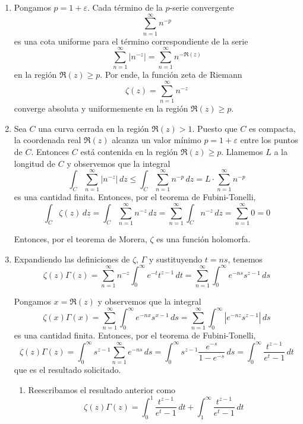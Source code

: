 \begin{solution}
\leavevmode
\begin{enumerate}[label=\alph*)]
    \item Pongamos $p = 1 + \varepsilon$. Cada término de la $p$-serie convergente
    $$\sum_{n=1}^\infty n^{-p}$$
    es una cota uniforme para el término correspondiente de la serie
    $$\sum_{n=1}^\infty \left| n^{-z} \right| = \sum_{n=1}^\infty n^{-\Re(z)}$$
    en la región $\Re(z) \ge p$. Por ende, la función zeta de Riemann
    $$\zeta(z) = \sum_{n=1}^\infty n^{-z}$$
    converge absoluta y uniformemente en la región $\Re(z) \ge p$.
    
    \item Sea $C$ una curva cerrada en la región $\Re(z) > 1$. Puesto que $C$ es compacta, la coordenada real $\Re(z)$ alcanza un valor mínimo $p = 1 + \varepsilon$ entre los puntos de $C$. Entonces $C$ está contenida en la región $\Re(z) \ge p$. Llamemos $L$ a la longitud de $C$ y observemos que la integral
    $$
    \int_C \sum_{n=1}^\infty \left| n^{-z} \right| \, dz
        \le \int_C \sum_{n=1}^\infty n^{-p} \, dz
        = L \cdot \sum_{n=1}^\infty n^{-p}
    $$
    es una cantidad finita. Entonces, por el teorema de Fubini-Tonelli,
    $$
    \int_C \zeta(z) \, dz
        = \int_C \sum_{n=1}^\infty n^{-z} \, dz
        = \sum_{n=1}^\infty \int_C n^{-z} \, dz
        = \sum_{n=1}^\infty 0
        = 0
    $$
    
    Entonces, por el teorema de Morera, $\zeta$ es una función holomorfa.
    
    \item Expandiendo las definiciones de $\zeta$, $\Gamma$ y sustituyendo $t = ns$, tenemos
    $$
    \zeta(z) \Gamma(z)
        = \sum_{n=1}^\infty n^{-z} \int_0^\infty e^{-t} t^{z-1} \, dt
        = \sum_{n=1}^\infty \int_0^\infty e^{-ns} s^{z-1} \, ds
    $$
    
    Pongamos $x = \Re(z)$ y observemos que la integral
    $$
    \zeta(x) \Gamma(x)
        = \sum_{n=1}^\infty \int_0^\infty e^{-nx} s^{x-1} \, ds
        = \sum_{n=1}^\infty \int_0^\infty \left| e^{-nz} s^{z-1} \right| \, ds
    $$
    es una cantidad finita. Entonces, por el teorema de Fubini-Tonelli,
    $$
    \zeta(z) \Gamma(z)
        = \int_0^\infty s^{z-1} \sum_{n=1}^\infty e^{-ns} \, ds
        = \int_0^\infty s^{z-1} \frac {e^{-s}} {1 - e^{-s}} \, ds
        = \int_0^\infty \frac {t^{z-1}} {e^t - 1} \, dt
    $$
    que es el resultado solicitado.
    
    \begin{enumerate}[label=\arabic*)]
        \item Reescribamos el resultado anterior como
        $$
        \zeta(z) \Gamma(z)
            = \int_0^1 \frac {t^{z-1}} {e^t - 1} \, dt
            + \int_1^\infty \frac {t^{z-1}} {e^t - 1} \, dt
        $$
        

\end{enumerate}
\end{enumerate}
\end{solution}
